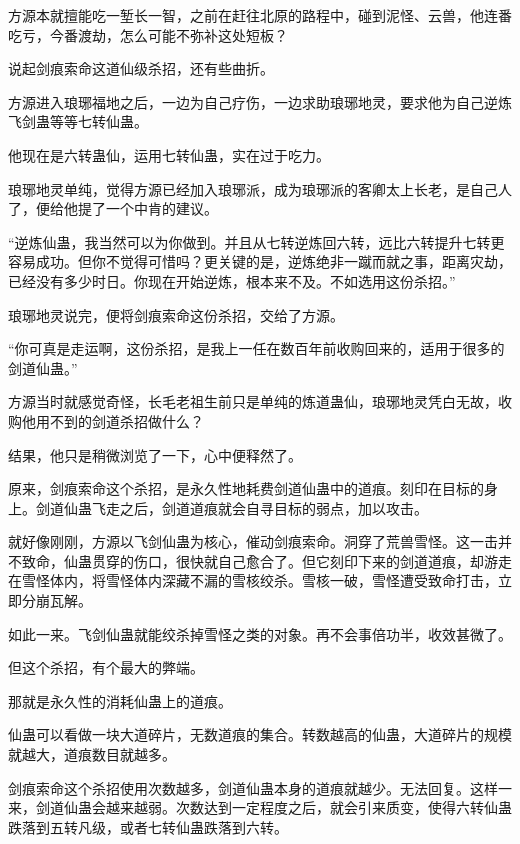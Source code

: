 
\begin{this_body}

方源本就擅能吃一堑长一智，之前在赶往北原的路程中，碰到泥怪、云兽，他连番吃亏，今番渡劫，怎么可能不弥补这处短板？

说起剑痕索命这道仙级杀招，还有些曲折。

方源进入琅琊福地之后，一边为自己疗伤，一边求助琅琊地灵，要求他为自己逆炼飞剑蛊等等七转仙蛊。

他现在是六转蛊仙，运用七转仙蛊，实在过于吃力。

琅琊地灵单纯，觉得方源已经加入琅琊派，成为琅琊派的客卿太上长老，是自己人了，便给他提了一个中肯的建议。

“逆炼仙蛊，我当然可以为你做到。并且从七转逆炼回六转，远比六转提升七转更容易成功。但你不觉得可惜吗？更关键的是，逆炼绝非一蹴而就之事，距离灾劫，已经没有多少时日。你现在开始逆炼，根本来不及。不如选用这份杀招。”

琅琊地灵说完，便将剑痕索命这份杀招，交给了方源。

“你可真是走运啊，这份杀招，是我上一任在数百年前收购回来的，适用于很多的剑道仙蛊。”

方源当时就感觉奇怪，长毛老祖生前只是单纯的炼道蛊仙，琅琊地灵凭白无故，收购他用不到的剑道杀招做什么？

结果，他只是稍微浏览了一下，心中便释然了。

原来，剑痕索命这个杀招，是永久性地耗费剑道仙蛊中的道痕。刻印在目标的身上。剑道仙蛊飞走之后，剑道道痕就会自寻目标的弱点，加以攻击。

就好像刚刚，方源以飞剑仙蛊为核心，催动剑痕索命。洞穿了荒兽雪怪。这一击并不致命，仙蛊贯穿的伤口，很快就自己愈合了。但它刻印下来的剑道道痕，却游走在雪怪体内，将雪怪体内深藏不漏的雪核绞杀。雪核一破，雪怪遭受致命打击，立即分崩瓦解。

如此一来。飞剑仙蛊就能绞杀掉雪怪之类的对象。再不会事倍功半，收效甚微了。

但这个杀招，有个最大的弊端。

那就是永久性的消耗仙蛊上的道痕。

仙蛊可以看做一块大道碎片，无数道痕的集合。转数越高的仙蛊，大道碎片的规模就越大，道痕数目就越多。

剑痕索命这个杀招使用次数越多，剑道仙蛊本身的道痕就越少。无法回复。这样一来，剑道仙蛊会越来越弱。次数达到一定程度之后，就会引来质变，使得六转仙蛊跌落到五转凡级，或者七转仙蛊跌落到六转。


\end{this_body}
